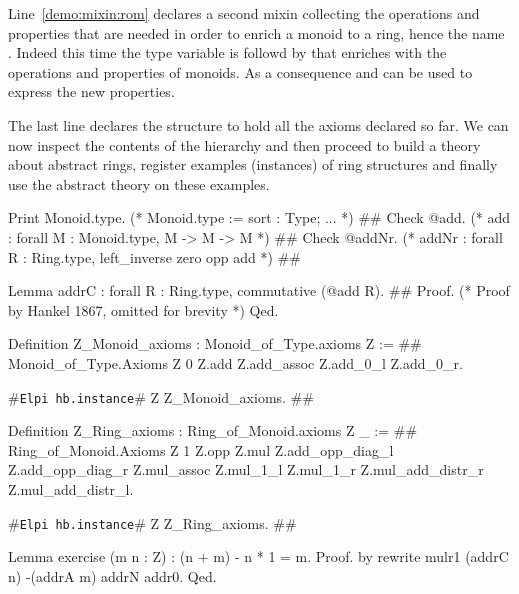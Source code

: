 \documentclass[a4paper,UKenglish,cleveref, autoref]{lipics-v2019}
\newcommand{\mixin}{mixin}
\newcommand{\hbinstance}{{\tt\color{dkgreen}Elpi hb.instance}}
\theoremstyle{implem}
\theoremstyle{implem}
\theoremstyle{command}
\begin{document}
Line~\ref{demo:mixin:rom} declares a second \mixin{} collecting the operations
and properties that are needed in order to enrich a monoid to a ring, hence
the name . Indeed this time the type variable 
is followd by  that enriches
 with the operations and properties of monoids. As a consequence
 and  can be used to express the new properties.

The last line declares the structure  to hold all the axioms declared
so far. We can now inspect the contents of the hierarchy and then
proceed to build a theory about abstract rings,
register examples (instances) of ring structures
and finally use the abstract theory on these examples.

\begin{coqcode}
Print Monoid.type. (* Monoid.type  :=  { sort : Type;  ... }                           *) #\label{demo:theory:print:type}#
Check @add.        (* add          :   forall M : Monoid.type, M -> M -> M             *) #\label{demo:theory:check:add}#
Check @addNr.      (* addNr        :   forall R : Ring.type, left_inverse zero opp add *) #\label{demo:theory:check:addNr}#

Lemma addrC : forall R : Ring.type, commutative (@add R).                       #\label{demo:theory:state:addrC}#
Proof. (* Proof by Hankel 1867, omitted for brevity *) Qed.

Definition Z_Monoid_axioms : Monoid_of_Type.axioms Z :=                         #\label{demo:theory:z:monoid:axioms}#
  Monoid_of_Type.Axioms Z 0 Z.add
    Z.add_assoc Z.add_0_l Z.add_0_r.

#\hbinstance{}# Z Z_Monoid_axioms.                                            #\label{demo:theory:z:monoid:canonical}#

Definition Z_Ring_axioms : Ring_of_Monoid.axioms Z _ :=                        #\label{demo:theory:z:ring:axioms}#
  Ring_of_Monoid.Axioms Z 1 Z.opp Z.mul
    Z.add_opp_diag_l Z.add_opp_diag_r Z.mul_assoc Z.mul_1_l Z.mul_1_r
    Z.mul_add_distr_r Z.mul_add_distr_l.

#\hbinstance{}# Z Z_Ring_axioms.                                              #\label{demo:theory:z:ring:canonical}#

Lemma exercise (m n : Z) : (n + m) - n * 1 = m.
Proof. by rewrite mulr1 (addrC n) -(addrA m) addrN addr0. Qed.
\end{coqcode}
\end{document}
